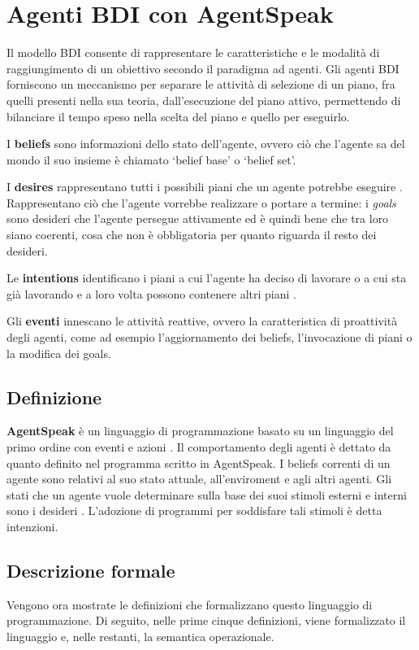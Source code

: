 \section{Agenti BDI con AgentSpeak}\label{sctn:AgentiBDI}
Il modello BDI consente di rappresentare le caratteristiche e le modalità di raggiungimento di un obiettivo secondo il paradigma ad agenti. Gli agenti BDI forniscono un meccanismo per separare le attività di selezione di un piano, fra quelli presenti nella sua teoria, dall'esecuzione del piano attivo, permettendo di bilanciare il tempo speso nella scelta del piano e quello per eseguirlo.

I \textbf{beliefs} sono informazioni dello stato dell'agente, ovvero ciò che l'agente sa del mondo \cite{AgentSpeakInJason} il suo insieme è chiamato `belief base' o `belief set'.

I \textbf{desires} rappresentano tutti i possibili piani che un agente potrebbe eseguire \cite{AgentSpeakInJason}. Rappresentano ciò che l'agente vorrebbe realizzare o portare a termine: i \textit{goals} sono desideri che l'agente persegue attivamente ed è quindi bene che tra loro siano coerenti, cosa che non è obbligatoria per quanto riguarda il resto dei desideri.

Le \textbf{intentions} identificano i piani a cui l'agente ha deciso di lavorare o a cui sta già lavorando e a loro volta possono contenere altri piani \cite{AgentSpeakInJason}.

Gli \textbf{eventi} innescano le attività reattive, ovvero la caratteristica di proattività degli agenti, come ad esempio l'aggiornamento dei beliefs, l'invocazione di piani o la modifica dei goals.

\subsection{Definizione}
\textbf{AgentSpeak} è un linguaggio di programmazione basato su un linguaggio del primo ordine con eventi e azioni \cite{AgentSpeak(L)}. Il comportamento degli agenti è dettato da quanto definito nel programma scritto in AgentSpeak.
I beliefs correnti di un agente sono relativi al suo stato attuale, all'enviroment e agli altri agenti. Gli stati che un agente vuole determinare sulla base dei suoi stimoli esterni e interni sono i desideri \cite{AgentSpeak(L)}. L'adozione di programmi per soddisfare tali stimoli è detta intenzioni.

\subsection{Descrizione formale}
Vengono ora mostrate le definizioni che formalizzano questo linguaggio di programmazione.
Di seguito, nelle prime cinque definizioni, viene formalizzato il linguaggio e, nelle restanti, la semantica operazionale.

